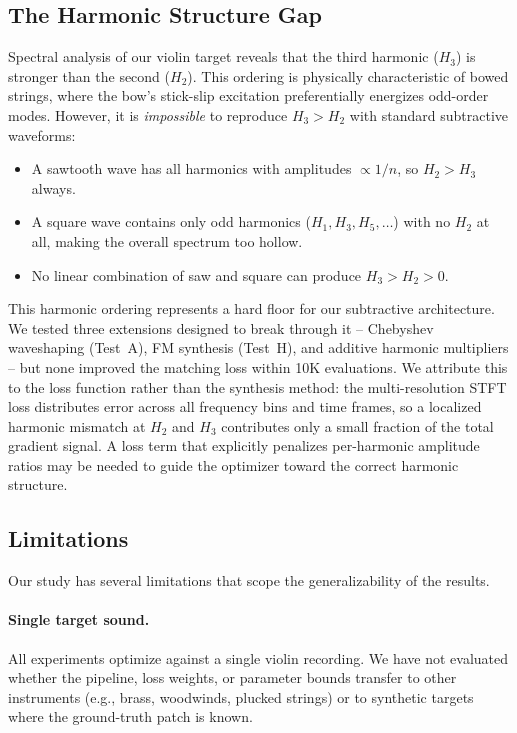 \subsection{The Harmonic Structure Gap}

Spectral analysis of our violin target reveals that the third harmonic ($H_3$) is stronger than the second ($H_2$).
This ordering is physically characteristic of bowed strings, where the bow's stick-slip excitation preferentially energizes odd-order modes.
However, it is \emph{impossible} to reproduce $H_3 > H_2$ with standard subtractive waveforms:
\begin{itemize}
    \item A sawtooth wave has all harmonics with amplitudes $\propto 1/n$, so $H_2 > H_3$ always.
    \item A square wave contains only odd harmonics ($H_1, H_3, H_5, \ldots$) with no $H_2$ at all, making the overall spectrum too hollow.
    \item No linear combination of saw and square can produce $H_3 > H_2 > 0$.
\end{itemize}

This harmonic ordering represents a hard floor for our subtractive architecture.
We tested three extensions designed to break through it -- Chebyshev waveshaping (Test~A), FM synthesis (Test~H), and additive harmonic multipliers -- but none improved the matching loss within 10K evaluations.
We attribute this to the loss function rather than the synthesis method: the multi-resolution STFT loss distributes error across all frequency bins and time frames, so a localized harmonic mismatch at $H_2$ and $H_3$ contributes only a small fraction of the total gradient signal.
A loss term that explicitly penalizes per-harmonic amplitude ratios may be needed to guide the optimizer toward the correct harmonic structure.

\subsection{Limitations}

Our study has several limitations that scope the generalizability of the results.

\paragraph{Single target sound.}
All experiments optimize against a single violin recording.
We have not evaluated whether the pipeline, loss weights, or parameter bounds transfer to other instruments (e.g., brass, woodwinds, plucked strings) or to synthetic targets where the ground-truth patch is known.

